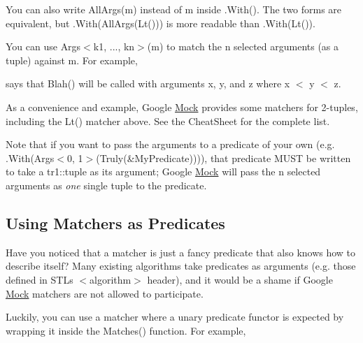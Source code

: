 You can also write {\ttfamily All\+Args(m)} instead of {\ttfamily m} inside {\ttfamily .With()}. The two forms are equivalent, but {\ttfamily .With(All\+Args(\+Lt()))} is more readable than {\ttfamily .With(\+Lt())}.

You can use {\ttfamily Args$<$k1, ..., kn$>$(m)} to match the {\ttfamily n} selected arguments (as a tuple) against {\ttfamily m}. For example,


\begin{DoxyCode}{0}
\end{DoxyCode}


says that {\ttfamily Blah()} will be called with arguments {\ttfamily x}, {\ttfamily y}, and {\ttfamily z} where {\ttfamily x $<$ y $<$ z}.

As a convenience and example, Google \mbox{\hyperlink{class_mock}{Mock}} provides some matchers for 2-\/tuples, including the {\ttfamily Lt()} matcher above. See the Cheat\+Sheet for the complete list.

Note that if you want to pass the arguments to a predicate of your own (e.\+g. {\ttfamily .With(Args$<$0, 1$>$(Truly(\&\+My\+Predicate)))}), that predicate M\+U\+ST be written to take a {\ttfamily tr1\+::tuple} as its argument; Google \mbox{\hyperlink{class_mock}{Mock}} will pass the {\ttfamily n} selected arguments as {\itshape one} single tuple to the predicate.

\subsection*{Using Matchers as Predicates}

Have you noticed that a matcher is just a fancy predicate that also knows how to describe itself? Many existing algorithms take predicates as arguments (e.\+g. those defined in S\+TL\textquotesingle{}s {\ttfamily $<$algorithm$>$} header), and it would be a shame if Google \mbox{\hyperlink{class_mock}{Mock}} matchers are not allowed to participate.

Luckily, you can use a matcher where a unary predicate functor is expected by wrapping it inside the {\ttfamily Matches()} function. For example,


\begin{DoxyCode}{0}
\DoxyCodeLine{}
\end{DoxyCode}


